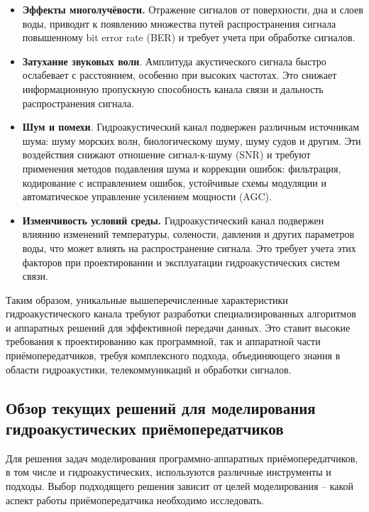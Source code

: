 \documentclass[
    numbers=section,
    document-code={ВКРБ--09.03.04--10.19--XX--26--81}
]{../latex/fqw}
\begin{document}
    \begin{itemize}
        \item \textbf{Эффекты многолучёвости.}
        Отражение сигналов от поверхности, дна и слоев воды, приводит к появлению множества путей распространения
        сигнала повышенному bit error rate (BER) и требует учета при обработке сигналов.
        \item
        \textbf{Затухание звуковых волн}.
        Амплитуда акустического сигнала быстро ослабевает с расстоянием, особенно при высоких частотах.
        Это снижает информационную пропускную способность канала связи и дальность распространения сигнала.
        \item
        \textbf{Шум и помехи}.
        Гидроакустический канал подвержен различным источникам шума:
        шуму морских волн,
        биологическому шуму,
        шуму судов и другим.
        Эти воздействия снижают отношение сигнал-к-шуму (SNR)
        и требуют применения методов подавления шума и коррекции ошибок:
        фильтрация,
        кодирование с исправлением ошибок,
        устойчивые схемы
        модуляции и автоматическое управление усилением мощности (AGC).
        \item \textbf{Изменчивость условий среды.}
        Гидроакустический канал подвержен влиянию изменений температуры, солености, давления и других параметров воды,
        что может влиять на распространение сигнала.
        Это требует учета этих факторов при проектировании и эксплуатации гидроакустических систем связи.
    \end{itemize}

    Таким образом, уникальные вышеперечисленные характеристики гидроакустического канала
    требуют разработки специализированных алгоритмов и аппаратных решений для эффективной передачи данных.
    Это ставит высокие требования к проектированию как программной, так и аппаратной части приёмопередатчиков,
    требуя комплексного подхода, объединяющего знания в области гидроакустики, телекоммуникаций и обработки сигналов.

    \subsection{Обзор текущих решений для моделирования гидроакустических приёмопередатчиков}
    \label{subsec:review_of_current_solutions_for_modeling_hydroacoustic_transceivers}
    \vspace{\baselineskip}

    Для решения задач моделирования программно-аппаратных приёмопередатчиков, в том числе и гидроакустических,
    используются различные инструменты и подходы.
    Выбор подходящего решения зависит от целей моделирования --
    какой аспект работы приёмопередатчика необходимо исследовать.
\end{document}

